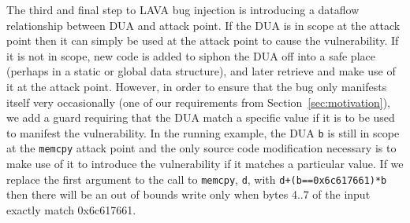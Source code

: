 The third and final step to LAVA bug injection is introducing a dataflow relationship between DUA and attack point.  
If the DUA is in scope at the attack point then it can simply be used at the attack point to cause the vulnerability.
If it is not in scope, new code is added to siphon the DUA off into a safe place (perhaps in a static or global data structure), and later retrieve and make use of it at the attack point. 
However, in order to ensure that the bug only manifests itself very occasionally (one of our requirements from Section~\ref{sec:motivation}), we add a guard requiring that the DUA match a specific value if it is to be used to manifest the vulnerability.
In the running example, the DUA \verb+b+ is still in scope at the \verb+memcpy+ attack point and the only source code modification necessary is to make use of it to introduce the vulnerability if it matches a particular value.  
If we replace the first argument to the call to \verb+memcpy+, \verb+d+, with \verb-d+(b==0x6c617661)*b- then there will be an out of bounds write only when bytes 4..7 of the input exactly match 0x6c617661. 

